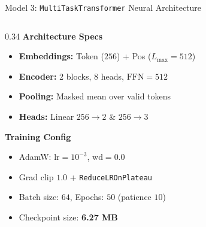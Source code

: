 \documentclass[aspectratio=169,10pt]{beamer}
\begin{document}
\begin{frame}{Model 3: \texttt{MultiTaskTransformer} Neural Architecture}
\begin{columns}[c,totalwidth=\textwidth]
    \begin{column}{0.34\textwidth}
      \textbf{Architecture Specs}
      \begin{itemize}\scriptsize
        \item \textbf{Embeddings:} Token ($256$) + Pos ($L_{\max}=512$)
        \item \textbf{Encoder:} 2 blocks, $8$ heads, $\text{FFN}=512$
        \item \textbf{Pooling:} Masked mean over valid tokens
        \item \textbf{Heads:} Linear $256 \to 2$ \& $256 \to 3$
      \end{itemize}
      \vspace{0.3em}
      \textbf{Training Config}
      \begin{itemize}\scriptsize
        \item AdamW: $\text{lr}=10^{-3}$, $\text{wd}=0.0$
        \item Grad clip $1.0$ + \texttt{ReduceLROnPlateau}
        \item Batch size: $64$, Epochs: $50$ (patience $10$)
        \item Checkpoint size: \textbf{6.27 MB}
      \end{itemize}
    \end{column}
  \end{columns}
\end{frame}
\end{document}

